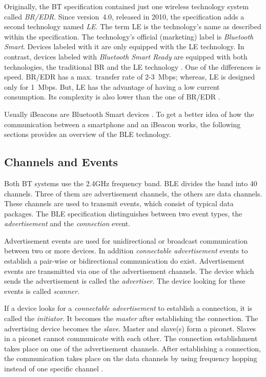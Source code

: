 Originally, the \acl{BT} specification contained just one wireless technology system called \emph{\ac{BR}/\ac{EDR}}. Since version~4.0, released in 2010, the specification adds a second technology named \emph{\ac{LE}}. The term \ac{LE} is the technology's name as described within the specification. The technology's official (marketing) label is \emph{Bluetooth Smart}. Devices labeled with it are only equipped with the \ac{LE} technology. In contrast, devices labeled with \emph{Bluetooth Smart Ready} are equipped with both technologies, the traditional \ac{BR} and the \ac{LE} technology \citep{bluetooth:spec}. One of the differences is speed. \ac{BR}/\ac{EDR} has a max.\ transfer rate of 2-3~Mbps; whereas, \ac{LE} is designed only for 1~Mbps. But, \ac{LE} has the advantage of having a low current consumption. Its complexity is also lower than the one of \ac{BR}/\ac{EDR} \citep{bluetooth:spec}.

Usually iBeacons are Bluetooth Smart devices \citep{binside:ds}. To get a better idea of how the communication between a smartphone and an iBeacon works, the following sections provides an overview of the \ac{BLE} technology.


\subsection*{Channels and Events}
Both \ac{BT} systems use the 2.4GHz frequency band. \ac{BLE} divides the band into 40 channels. Three of them are advertisement channels, the others are data channels. These channels are used to transmit events, which consist of typical data packages. The \ac{BLE} specification distinguishes between two event types, the \emph{advertisement} and the \emph{connection} event.

Advertisement events are used for unidirectional or broadcast communication between two or more devices. In addition \emph{connectable advertisement} events to establish a pair-wise or bidirectional communication do exist. Advertisement events are transmitted via one of the advertisement channels. The device which sends the advertisement is called the \emph{advertiser}. The device looking for these events is called \emph{scanner}.

If a device looks for a \emph{connectable advertisement} to establish a connection, it is called the \emph{initiator}. It becomes the \emph{master} after establishing the connection. The advertising device becomes the \emph{slave}. Master and slave(s) form a piconet. Slaves in a piconet cannot communicate with each other. The connection establishment takes place on one of the advertisement channels. After establishing a connection, the communication takes place on the data channels by using frequency hopping instead of one specific channel \citep{bluetooth:spec}.

